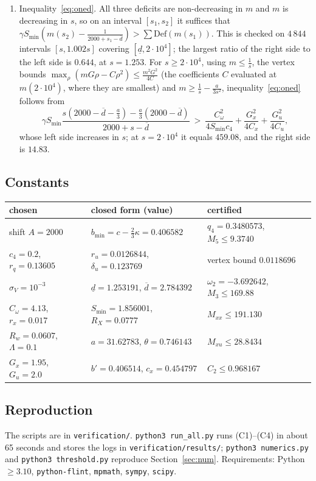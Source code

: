 \documentclass[11pt]{article}
\theoremstyle{definition}
\numberwithin{equation}{section}
\newcommand{\Azero}{2000}
\newcommand{\dlo}{\underline d}
\newcommand{\dhi}{\overline d}
\newcommand{\Smin}{S_{\min}}
\newcommand{\bmin}{b_{\min}}
\begin{document}
\begin{enumerate}[label=(C\arabic*),leftmargin=3em]
\begin{enumerate}[label=(\arabic*),leftmargin=1.8em]
differences to avoid cancellation) evaluated on $117$ boxes of half-width $0.005$ in $q$ times $2196$ boxes of half-width $0.0015$
covering $|\zeta-U|\le R_X$.
\item Inequality~\eqref{eq:oned}. All three deficits are non-decreasing in $m$ and $m$ is decreasing in $s$, so on an interval
$[s_1,s_2]$ it suffices that $\gamma\Smin(m(s_2)-\frac1{\Azero+s_1-\dhi})>\sum\mathrm{Def}(m(s_1))$. This is checked on $4\,844$ intervals
$[s,1.002s]$ covering $[\dlo,2\cdot10^4]$; the largest ratio of the right side to the left side is $0.644$, at $s=1.253$. For $s\ge2\cdot10^4$,
using $m\le\frac1s$, the vertex bounds $\max_\rho(mG\rho-C\rho^2)\le\frac{m^2G^2}{4C}$ (the coefficients $C$ evaluated at $m(2\cdot10^4)$, where
they are smallest) and $m\ge\frac1s-\frac a{3s^2}$, inequality~\eqref{eq:oned} follows from
\[
\gamma\Smin\frac{s(\Azero-\dhi-\frac a3)-\frac a3(\Azero-\dhi)}{\Azero+s-\dhi}\ >\ \frac{C_\omega^2}{4\Smin c_4}+\frac{G_x^2}{4C_x}+\frac{G_u^2}{4C_u},
\]
whose left side increases in $s$; at $s=2\cdot10^4$ it equals $459.08$, and the right side is $14.83$.
\end{enumerate}
\end{enumerate}

\subsection{Constants}
\begin{center}
\begin{tabular}{lll}
\toprule
chosen & closed form (value) & certified\\
\midrule
shift $A=2000$ & $\bmin=c-\frac23\kappa=0.406582$ & $q_4=0.3480573$, $M_5\le9.3740$\\
$c_4=0.2$, $r_q=0.13605$ & $r_u=0.0126844$, $\delta_u=0.123769$ & vertex bound $0.0118696$\\
$\sigma_V=10^{-3}$ & $\dlo=1.253191$, $\dhi=2.784392$ & $\omega_2=-3.692642$, $M_3\le169.88$\\
$C_\omega=4.13$, $r_x=0.017$ & $\Smin=1.856001$, $R_X=0.0777$ & $M_{xx}\le191.130$\\
$R_w=0.0607$, $\Lambda=0.1$ & $a=31.62783$, $\theta=0.746143$ & $M_{xu}\le28.8434$\\
$G_x=1.95$, $G_u=2.0$ & $b'=0.406514$, $c_x=0.454797$ & $C_2\le0.968167$\\
\bottomrule
\end{tabular}
\end{center}

\subsection{Reproduction}
The scripts are in \texttt{verification/}. \texttt{python3 run\_all.py} runs (C1)--(C4) in about 65 seconds and stores the logs in
\texttt{verification/results/}; \texttt{python3 numerics.py} and \texttt{python3 threshold.py} reproduce Section~\ref{sec:num}.
Requirements: Python $\ge3.10$, \texttt{python-flint}, \texttt{mpmath}, \texttt{sympy}, \texttt{scipy}.
\end{document}
